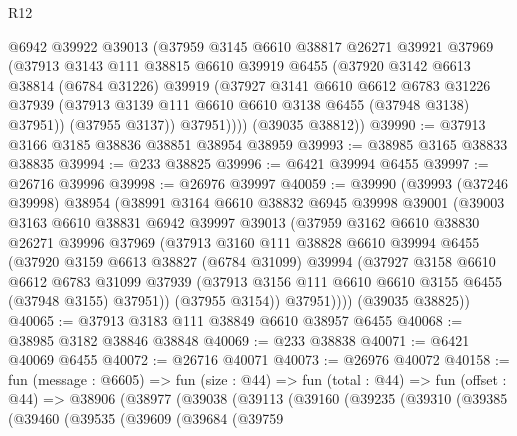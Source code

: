 \begin{lexlean}{R12}
\begin{coremodule}
          @6942
          @39922
          @39013
          (@37959
            @3145
            @6610
            @38817
            @26271
            @39921
            @37969
            (@37913
              @3143
              @111
              @38815
              @6610
              @39919
              @6455
              (@37920
                @3142
                @6613
                @38814
                (@6784 @31226)
                @39919
                (@37927
                  @3141
                  @6610
                  @6612
                  @6783
                  @31226
                  @37939
                  (@37913 @3139 @111 @6610 @6610 @3138 @6455 (@37948 @3138) @37951))
                (@37955 @3137))
              @37951))))
      (@39035 @38812))
@39990 := @37913 @3166 @3185 @38836 @38851 @38954 @38959
@39993 := @38985 @3165 @38833 @38835
@39994 := @233 @38825
@39996 := @6421 @39994 @6455
@39997 := @26716 @39996
@39998 := @26976 @39997
@40059 := @39990
    (@39993
      (@37246 @39998)
      @38954
      (@38991
        @3164
        @6610
        @38832
        @6945
        @39998
        @39001
        (@39003
          @3163
          @6610
          @38831
          @6942
          @39997
          @39013
          (@37959
            @3162
            @6610
            @38830
            @26271
            @39996
            @37969
            (@37913
              @3160
              @111
              @38828
              @6610
              @39994
              @6455
              (@37920
                @3159
                @6613
                @38827
                (@6784 @31099)
                @39994
                (@37927
                  @3158
                  @6610
                  @6612
                  @6783
                  @31099
                  @37939
                  (@37913 @3156 @111 @6610 @6610 @3155 @6455 (@37948 @3155) @37951))
                (@37955 @3154))
              @37951))))
      (@39035 @38825))
@40065 := @37913 @3183 @111 @38849 @6610 @38957 @6455
@40068 := @38985 @3182 @38846 @38848
@40069 := @233 @38838
@40071 := @6421 @40069 @6455
@40072 := @26716 @40071
@40073 := @26976 @40072
@40158 := fun (message : @6605) =>
  fun (size : @44) =>
  fun (total : @44) =>
  fun (offset : @44) =>
  @38906
    (@38977
      (@39038
        (@39113
          (@39160
            (@39235
              (@39310
                (@39385
                  (@39460
                    (@39535
                      (@39609
                        (@39684
                          (@39759

\end{coremodule}
\end{lexlean}
